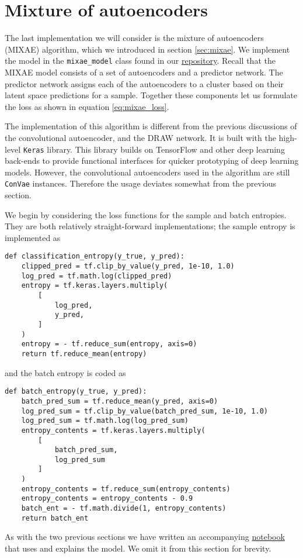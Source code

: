 \section{Mixture of autoencoders}

The last implementation we will consider is the mixture of autoencoders (MIXAE) algorithm, which we introduced in section \ref{sec:mixae}. We implement the model in the \lstinline{mixae_model} class found in our \href{https://GitHub.com/ATTPC/VAE-event-classification/blob/master/src/mixae.py}{repository}. Recall that the MIXAE model consists of a set of autoencoders and a predictor network. The predictor network assigns each of the autoencoders to a cluster based on their latent space predictions for a sample.  Together these components let us formulate the loss as shown in equation \ref{eq:mixae_loss}.

The implementation of this algorithm is different from the previous discussions of the convolutional autoencoder, and the DRAW network. It is built with the high-level \lstinline{Keras} library. This library builds on TensorFlow and other deep learning back-ends to provide functional interfaces for quicker prototyping of deep learning models. However, the convolutional autoencoders used in the algorithm are still \lstinline{ConVae} instances. Therefore the usage deviates somewhat from the previous section. 

We begin by considering the loss functions for the sample and batch entropies. They are both relatively straight-forward implementations; the sample entropy is implemented as  

\begin{minipage}{\linewidth}
\begin{lstlisting}[language=iPython]
def classification_entropy(y_true, y_pred):
    clipped_pred = tf.clip_by_value(y_pred, 1e-10, 1.0)
    log_pred = tf.math.log(clipped_pred)
    entropy = tf.keras.layers.multiply(
        [
            log_pred,
            y_pred,
        ]
    )
    entropy = - tf.reduce_sum(entropy, axis=0)
    return tf.reduce_mean(entropy)
\end{lstlisting}
\end{minipage}

and the batch entropy is coded as 

\begin{minipage}{\linewidth}
\begin{lstlisting}[language=iPython]
def batch_entropy(y_true, y_pred):
    batch_pred_sum = tf.reduce_mean(y_pred, axis=0)
    log_pred_sum = tf.clip_by_value(batch_pred_sum, 1e-10, 1.0)
    log_pred_sum = tf.math.log(log_pred_sum)
    entropy_contents = tf.keras.layers.multiply(
        [
            batch_pred_sum,
            log_pred_sum
        ]
    )
    entropy_contents = tf.reduce_sum(entropy_contents)
    entropy_contents = entropy_contents - 0.9 
    batch_ent = - tf.math.divide(1, entropy_contents)
    return batch_ent
\end{lstlisting}
\end{minipage}

\noindent As with the two previous sections we have written an accompanying \href{https://GitHub.com/ATTPC/VAE-event-classification/blob/master/notebooks/mixae_tutorial.ipynb}{notebook} that uses and explains the model. We omit it from this section for brevity.